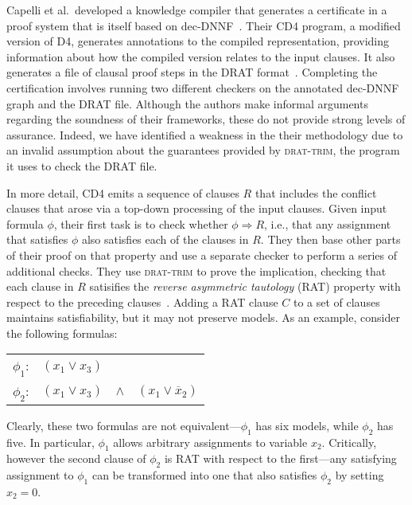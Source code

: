 \documentclass[letterpaper,USenglish,cleveref, autoref, thm-restate]{lipics-v2021}
\newcommand{\obar}[1]{\overline{#1}}
\newcommand{\imply}{\Rightarrow}
\newcommand{\progname}[1]{\textsc{#1}}
\newcommand{\dfour}{\progname{D4}}
\newcommand{\cdfour}{\progname{CD4}}
\newcommand{\dtrim}{\progname{drat-trim}}
\begin{document}
Capelli et al.\ developed a knowledge compiler
that generates a certificate in a proof system that is itself based on
dec-DNNF~\cite{capelli:sat:2019,capelli:aaai:2021}.  Their \cdfour{} program,
a modified version of \dfour{}, generates annotations to the
compiled representation, providing information about how the compiled version relates to the input clauses.
It also generates a file of clausal proof steps in the DRAT format~\cite{wetzler14_drattrim}.
Completing the certification involves running two different checkers on
the annotated dec-DNNF graph and the DRAT file.
Although the authors make informal arguments
regarding the soundness of their frameworks, these do not provide
strong levels of assurance.  Indeed, 
we have identified a weakness in the their
methodology due to an invalid assumption about the
guarantees provided by \dtrim{}, the program it uses to check the
DRAT file.

In more detail, \cdfour{} emits a sequence of clauses $R$ that
includes the conflict clauses that arose via a top-down processing of
the input clauses.  Given input formula $\phi$, their first task is to
check whether $\phi \imply R$, i.e., that any assignment that satisfies $\phi$ also satisfies each of the clauses in $R$.
They then base other parts of their proof on that
property and use a separate checker to perform a series of additional
checks.  They use \dtrim{} to prove the implication, checking that each clause in $R$
satisifies the \emph{reverse asymmetric tautology} (RAT) property with
respect to the preceding
clauses~\cite{heule:cade:2013,jarvisalo:ijcar:2012}.  Adding a RAT
clause $C$ to a set of clauses maintains satisfiability, but it may
not preserve models.  As an example, consider the following formulas:
\begin{center}
  \begin{tabular}{lccc}
    $\phi_1$: & $(x_1 \lor x_3)$ & & \\
    $\phi_2$: & $(x_1 \lor x_3)$ & $\land$ & $(x_1 \lor \obar{x}_2)$\\    
  \end{tabular}
\end{center}
Clearly, these two formulas are not equivalent---$\phi_1$ has six
models, while $\phi_2$ has five.  In particular, $\phi_1$ allows
arbitrary assignments to variable $x_2$.  Critically, however the
second clause of $\phi_2$ is RAT with respect to the first---any
satisfying assignment to $\phi_1$ can be transformed into one that
also satisfies $\phi_2$ by setting $x_2 = 0$.
  
\end{document}
